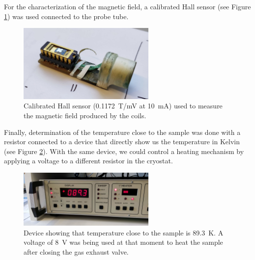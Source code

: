 \documentclass[11pt,a4paper]{article}
\begin{document}
For the characterization of the magnetic field, a calibrated Hall sensor (see Figure \ref{fig:Hall_sensor}) was used connected to the probe tube.

\begin{figure}[H]
\centering
\includegraphics[width=0.6\textwidth]{Hall_sensor}
\caption{Calibrated Hall sensor (\SI{0.1172}{\tesla/\milli\volt} at \SI{10}{\milli\ampere}) used to measure the magnetic field produced by the coils.}
\label{fig:Hall_sensor}
\end{figure}

Finally, determination of the temperature close to the sample was done with a resistor connected to a device that directly show us the temperature in Kelvin (see Figure \ref{fig:temperature_device}). With the same device, we could control a heating mechanism by applying a voltage to a different resistor in the cryostat.

\begin{figure}[H]
\centering
\includegraphics[width=0.6\textwidth]{temperature_device}
\caption{Device showing that temperature close to the sample is \SI{89.3}{\kelvin}. A voltage of \SI{8}{\volt} was being used at that moment to heat the sample after closing the gas exhaust valve.}
\label{fig:temperature_device}
\end{figure}
\end{document}
